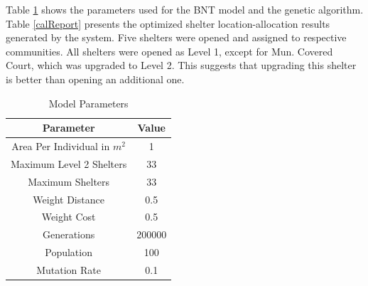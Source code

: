	Table \ref{modelParams} shows the parameters used for the BNT model and the genetic algorithm. Table \ref{calReport} presents the optimized shelter location-allocation results generated by the system. Five shelters were opened and assigned to respective communities. All shelters were opened as Level 1, except for Mun. Covered Court, which was upgraded to Level 2. This suggests that upgrading this shelter is better than opening an additional one.
	
	\begin{table}[h]
		\centering
		\caption{Model Parameters}
		\label{modelParams}
		\begin{tabular}{|c|c|}
			\hline
			\textbf{Parameter} & \textbf{Value} \\ \hline
			Area Per Individual in $m^2$ & 1 \\ 
			Maximum Level 2 Shelters  & 33 \\ 
			Maximum Shelters & 33 \\ 
			Weight Distance & 0.5 \\ 
			Weight Cost & 0.5 \\ 
			Generations & 200000 \\ 
			Population & 100 \\ 
			Mutation Rate & 0.1 \\ \hline
		\end{tabular}
	\end{table}
	
